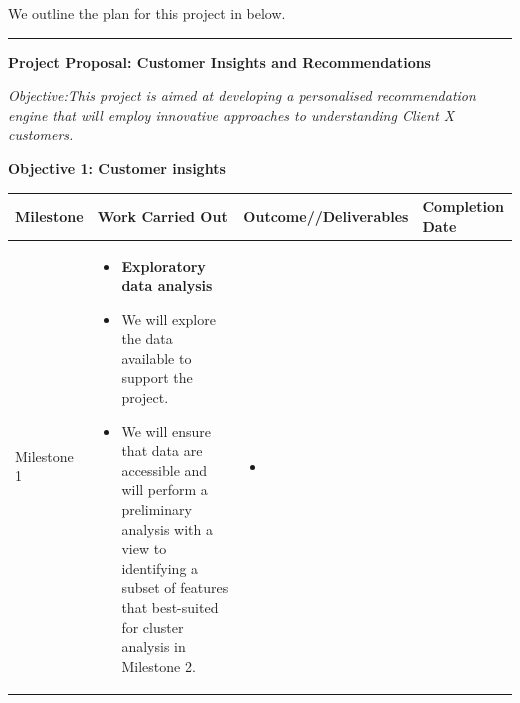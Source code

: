 \documentclass[
]{book}
\providecommand{\tightlist}{%
  \setlength{\itemsep}{0pt}\setlength{\parskip}{0pt}}
\begin{document}
We outline the plan for this project in below.

\begin{center}\rule{0.5\linewidth}{0.5pt}\end{center}

\textbf{Project Proposal: Customer Insights and Recommendations}

\emph{Objective:This project is aimed at developing a personalised
recommendation engine that will employ innovative approaches to
understanding Client X customers.}

\textbf{Objective 1: Customer insights}

\begin{smaller}

\begin{longtable}[]{@{}llll@{}}
\toprule
\begin{minipage}[b]{0.14\columnwidth}\raggedright
Milestone\strut
\end{minipage} & \begin{minipage}[b]{0.30\columnwidth}\raggedright
Work Carried Out\strut
\end{minipage} & \begin{minipage}[b]{0.30\columnwidth}\raggedright
Outcome//Deliverables\strut
\end{minipage} & \begin{minipage}[b]{0.15\columnwidth}\raggedright
Completion Date\strut
\end{minipage}\tabularnewline
\midrule
\endhead
\begin{minipage}[t]{0.14\columnwidth}\raggedright
Milestone 1\strut
\end{minipage} & \begin{minipage}[t]{0.30\columnwidth}\raggedright
\begin{itemize}
\tightlist
\item
  \textbf{Exploratory data analysis}
\item
  We will explore the data available to support the project.
\item
  We will ensure that data are accessible and will perform a preliminary
  analysis with a view to identifying a subset of features that
  best-suited for cluster analysis in Milestone 2.
\end{itemize}\strut
\end{minipage} & \begin{minipage}[t]{0.30\columnwidth}\raggedright
\begin{itemize}
\tightlist
\item

\end{itemize}
\end{minipage}
\end{longtable}
\end{smaller}
\end{document}
